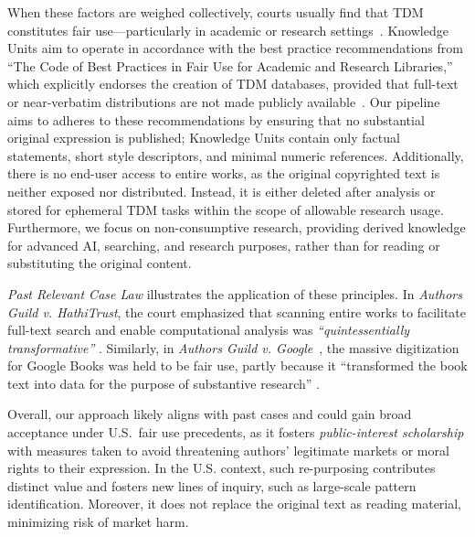 When these factors are weighed collectively, courts usually find that TDM constitutes fair use—particularly in academic or research settings~\citep{USfairuseTDM2015, hathitrustcase}. Knowledge Units aim to operate in accordance with the best practice recommendations from “The Code of Best Practices in Fair Use for Academic and Research Libraries,” which explicitly endorses the creation of TDM databases, provided that full-text or near-verbatim distributions are not made publicly available~\citep{USfairuseTDM2015}. Our pipeline aims to adheres to these recommendations by ensuring that no substantial original expression is published; Knowledge Units contain only factual statements, short style descriptors, and minimal numeric references. Additionally, there is no end-user access to entire works, as the original copyrighted text is neither exposed nor distributed. Instead, it is either deleted after analysis or stored for ephemeral TDM tasks within the scope of allowable research usage. Furthermore, we focus on non-consumptive research, providing derived knowledge for advanced AI, searching, and research purposes, rather than for reading or substituting the original content.

\textit{Past Relevant Case Law} illustrates the application of these principles. In \emph{Authors Guild v. HathiTrust}, the court emphasized that scanning entire works to facilitate full-text search and enable computational analysis was \emph{“quintessentially transformative”} \cite{hathitrustcase}. Similarly, in \emph{Authors Guild v. Google}~\cite{campbell2016authors}, the massive digitization for Google Books was held to be fair use, partly because it “transformed the book text into data for the purpose of substantive research” \cite{googleBooksCase}.

Overall, our approach likely aligns with past cases and could gain broad acceptance under U.S.\ fair use precedents, as it fosters \textit{public-interest scholarship} with measures taken to avoid threatening authors’ legitimate markets or moral rights to their expression. In the U.S. context, such re-purposing contributes distinct value and fosters new lines of inquiry, such as large-scale pattern identification. Moreover, it does not replace the original text as reading material, minimizing risk of market harm.

